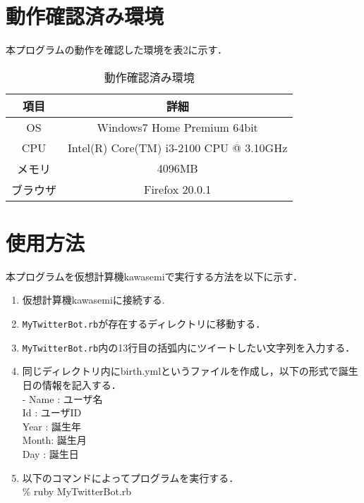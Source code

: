 \documentclass[fleqn, 14pt]{extarticlej}
\begin{document}
\section{動作確認済み環境}
本プログラムの動作を確認した環境を表2に示す．
\begin{table}[h]
  \begin{center}
    \caption{動作確認済み環境}
    \begin{tabular}{c|c}\hline\hline
      項目  & 詳細　\\ \hline
       OS     & Windows7 Home Premium 64bit \\ 
      CPU   & Intel(R) Core(TM) i3-2100 CPU @ 3.10GHz\\ 
      メモリ   & 4096MB \\ 
      ブラウザ & Firefox 20.0.1 \\ \hline
    \end{tabular} 
  \end{center}
\end{table}
  
\section{使用方法}
本プログラムを仮想計算機kawasemiで実行する方法を以下に示す．
\begin{enumerate}
  \item 仮想計算機kawasemiに接続する.
  \item \verb|MyTwitterBot.rb|が存在するディレクトリに移動する．
  \item \verb|MyTwitterBot.rb|内の13行目の括弧内にツイートしたい文字列を入力する．
  \item 同じディレクトリ内にbirth.ymlというファイルを作成し，以下の形式で誕生日の情報を記入する．\\
   \hspace{1.0zw}- Name : ユーザ名\\
   \hspace{1.5zw}  Id   : ユーザID\\
   \hspace{1.5zw}  Year : 誕生年\\
   \hspace{1.5zw}  Month: 誕生月\\
   \hspace{1.5zw}  Day  : 誕生日\\
   

  \item 以下のコマンドによってプログラムを実行する．\\
  \hspace{1.0zw}\% ruby MyTwitterBot.rb\\
\end{enumerate}
\end{document}

